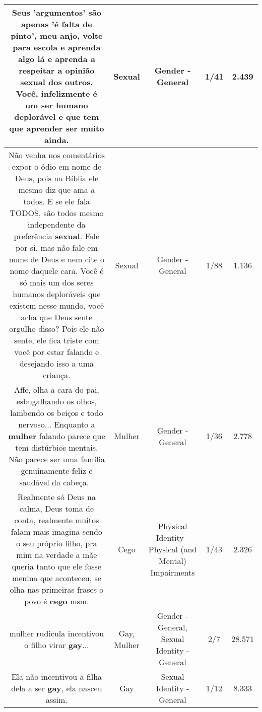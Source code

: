 \documentclass[11pt]{article}
\newlength\mylength
\begin{document}
\begin{center}
\begin{longtable}{|C{.65\mylength}|C{.30\mylength}|C{.12\mylength}|C{.12\mylength}|C{.12\mylength}|}
  \small Seus 'argumentos' são apenas 'é falta de pinto', meu anjo, volte para escola e aprenda algo lá e aprenda a respeitar a opinião \textbf{sexual} dos outros. Você, infelizmente é um ser humano deplorável e que tem que aprender ser muito ainda.\normalsize   & Sexual & Gender - General & 1/41 & 2.439 \\  \hline
  \small Não venha nos comentários expor o ódio em nome de Deus, pois na Bíblia ele mesmo diz que ama a todos. E se ele fala TODOS, são todos mesmo independente da preferência \textbf{sexual}. Fale por si, mas não fale em nome de Deus e nem cite o nome daquele cara. Você é só mais um dos seres humanos deploráveis que existem nesse mundo, você acha que Deus sente orgulho disso? Pois ele não sente, ele fica triste com você por estar falando e desejando isso a uma criança.\normalsize   & Sexual & Gender - General & 1/88 & 1.136 \\  \hline
  \small Affe, olha a cara do pai, esbugalhando os olhos, lambendo os beiços e todo nervoso... Enquanto a \textbf{mulher} falando parece que tem distúrbios mentais. Não parece ser uma família genuinamente feliz e saudável da cabeça. 🤔\normalsize   & Mulher & Gender - General & 1/36 & 2.778 \\  \hline
  \small Realmente só Deus na calma, Deus toma de conta, realmente muitos falam mais imagina sendo o seu próprio filho, pra mim na verdade a mãe queria tanto que ele fosse menina que aconteceu, se olha nas primeiras frases o povo é \textbf{cego} msm.\normalsize   & Cego & Physical Identity - Physical (and Mental) Impairments & 1/43 & 2.326 \\  \hline
  \small mulher rudicula incentivou o filho virar \textbf{gay}...\normalsize   & Gay, Mulher & Gender - General, Sexual Identity - General & 2/7 & 28.571 \\  \hline
  \small Ela não incentivou a filha dela a ser \textbf{gay}, ela nasceu assim.\normalsize   & Gay & Sexual Identity - General & 1/12 & 8.333 \\  \hline

\end{longtable}
\end{center}
\end{document}
